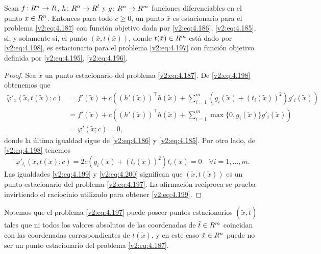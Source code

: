 \begin{lemma}\label{v2:lem:4.5.3}
    Sean $f \colon R^n \to R$, $h \colon R^n \to R^l$ y $g \colon R^n \to R^m$ funciones diferenciables en el punto $\bar{x} \in R^n$.
    Entonces para todo $c \ge 0$, un punto $\bar{x}$ es estacionario para el problema \eqref{v2:eq:4.187} con función objetivo dada por \eqref{v2:eq:4.186}, \eqref{v2:eq:4.185}, si, y solamente si, el punto $(\bar{x}, t(\bar{x}))$, donde $t(\bar{x}) \in R^m$ está dado por \eqref{v2:eq:4.198}, es estacionario para el problema \eqref{v2:eq:4.197} con función objetivo definida por \eqref{v2:eq:4.195}, \eqref{v2:eq:4.196}.
\end{lemma}
\begin{proof}
    Sea $\tilde{x}$ un punto estacionario del problema \eqref{v2:eq:4.187}. De \eqref{v2:eq:4.198} obtenemos que
    \begin{align*}
        \tilde{\varphi}'_x(\tilde{x}, t(\tilde{x}); c) &= f'(\tilde{x}) + c \left( (h'(\tilde{x}))^\top h(\tilde{x}) + \sum_{i=1}^m (g_i(\tilde{x}) + (t_i(\tilde{x}))^2) g'_i(\tilde{x}) \right) \\
        &= f'(\tilde{x}) + c \left( (h'(\tilde{x}))^\top h(\tilde{x}) + \sum_{i=1}^m \max\{0, g_i(\tilde{x})\} g'_i(\tilde{x}) \right) \\
        &= \varphi'(\tilde{x}; c) = 0,
    \end{align*}
    donde la última igualdad sigue de \eqref{v2:eq:4.186} y \eqref{v2:eq:4.185}. Por otro lado, de \eqref{v2:eq:4.198} tenemos
    \begin{equation}
        \tilde{\varphi}'_{t_i}(\tilde{x}, t(\tilde{x}); c) = 2c(g_i(\tilde{x}) + (t_i(\tilde{x}))^2) t_i(\tilde{x}) = 0 \quad \forall i = 1, \dots, m.
        \label{v2:eq:4.200}
    \end{equation}
    Las igualdades \eqref{v2:eq:4.199} y \eqref{v2:eq:4.200} significan que $(\tilde{x}, t(\tilde{x}))$ es un punto estacionario del problema \eqref{v2:eq:4.197}.
    La afirmación recíproca se prueba invirtiendo el raciocinio utilizado para obtener \eqref{v2:eq:4.199}.
\end{proof}

Notemos que el problema \eqref{v2:eq:4.197} puede poseer puntos estacionarios $(\tilde{x}, \tilde{t})$ tales que ni todos los valores absolutos de las coordenadas de $\tilde{t} \in R^m$ coincidan con las coordenadas correspondientes de $t(\tilde{x})$, y en este caso $\tilde{x} \in R^n$ puede no ser un punto estacionario del problema \eqref{v2:eq:4.187}.

